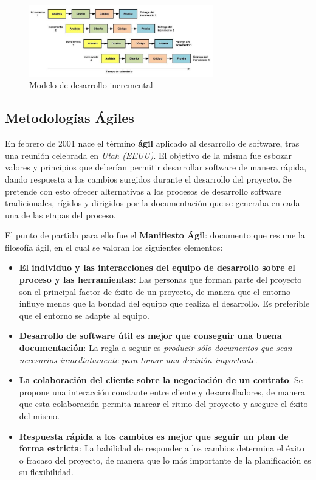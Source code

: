 \begin{itemize}
    \begin{figure}[H]
        \centering
        \includegraphics[width=8cm]{Figures/modelo_incremental.png}
        \caption{Modelo de desarrollo incremental}
    \end{figure}
\end{itemize}

\subsection{Metodologías Ágiles}
En febrero de 2001 nace el término \textbf{ágil} aplicado al desarrollo de software, tras una reunión celebrada en 
\textit{Utah (EEUU)}. El objetivo de la misma fue esbozar valores y principios que deberían permitir desarrollar 
software de manera rápida, dando respuesta a los cambios surgidos durante el desarrollo del proyecto. Se pretende 
con esto ofrecer alternativas a los procesos de desarrollo software tradicionales, rígidos y dirigidos por la documentación 
que se generaba en cada una de las etapas del proceso.\medskip

El punto de partida para ello fue el \textbf{Manifiesto Ágil}: %
documento que resume la filosofía ágil, en el cual se valoran los siguientes elementos:
\begin{itemize}
    \item \textbf{El individuo y las interacciones del equipo de desarrollo sobre el proceso y las herramientas}:
    Las personas que forman parte del proyecto son el principal factor de éxito de un proyecto, de manera que el entorno
    influye menos que la bondad del equipo que realiza el desarrollo. Es preferible que el entorno se adapte al equipo.

    \item \textbf{Desarrollo de software útil es mejor que conseguir una buena documentación}:
    La regla a seguir es \textit{producir sólo documentos que sean necesarios inmediatamente para tomar una 
    decisión importante}.

    \item \textbf{La colaboración del cliente sobre la negociación de un contrato}: Se propone una interacción 
    constante entre cliente y desarrolladores, de manera que esta colaboración permita marcar el ritmo del 
    proyecto y asegure el éxito del mismo.

    \item \textbf{Respuesta rápida a los cambios es mejor que seguir un plan de forma estricta}:
    La habilidad de responder a los cambios determina el éxito o fracaso del proyecto, de manera que lo
    más importante de la planificación es su flexibilidad.
\end{itemize} 


